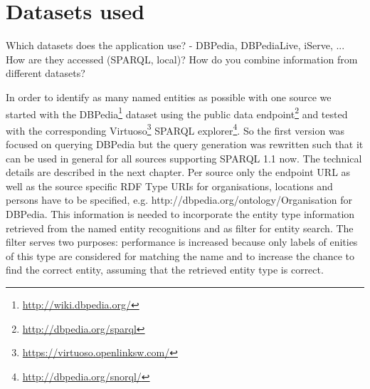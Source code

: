 \section{Datasets used} 
Which datasets does the application use?
- DBPedia, DBPediaLive, iServe, ... 
How are they accessed (SPARQL, local)?
How do you combine information from different datasets? 

In order to identify as many named entities as possible with one source we started with the DBPedia\footnote{\url{http://wiki.dbpedia.org/}} dataset using the public data endpoint\footnote{\url{http://dbpedia.org/sparql}} and tested with the corresponding Virtuoso\footnote{\url{https://virtuoso.openlinksw.com/}} SPARQL explorer\footnote{\url{http://dbpedia.org/snorql/}}. So the first version was focused on querying DBPedia but the query generation was rewritten such that it can be used in general for all sources supporting SPARQL 1.1 now. The technical details are described in the next chapter. Per source only the endpoint URL as well as the source specific RDF Type URIs for organisations, locations and persons have to be specified, e.g. http://dbpedia.org/ontology/Organisation for DBPedia. This information is needed to incorporate the entity type information retrieved from the named entity recognitions and as filter for entity search. The filter serves two purposes: performance is increased because only labels of enities of this type are considered for matching the name and to increase the chance to find the correct entity, assuming that the retrieved entity type is correct. 

